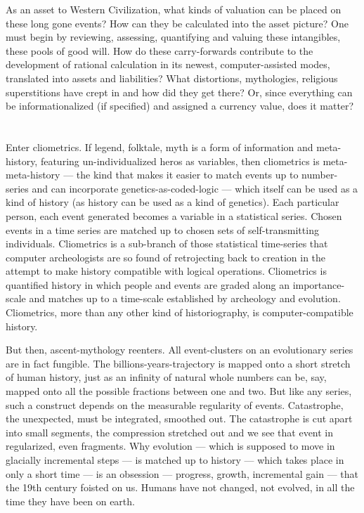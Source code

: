 \documentclass[11pt,twoside,draft]{memoir}
\begin{document}
As an asset to Western Civilization, what
kinds of valuation can be placed on these
long gone events? How can they be calculated into the asset picture? One must begin
by reviewing, assessing, quantifying and
valuing these intangibles, these pools of
good will. How do these carry-forwards contribute to the development of rational calculation in its newest, computer-assisted modes,
translated into assets and liabilities? What
distortions, mythologies, religious superstitions have crept in and how did they get
there? Or, since everything can be informationalized (if specified) and assigned a currency value, does it matter?

\chapter{}

Enter cliometrics. If legend, folktale, myth
is a form of information and meta-history,
featuring un-individualized heros as variables, then cliometrics is meta-meta-history --- 
the kind that makes it easier to match events
up to number-series and can incorporate
genetics-as-coded-logic --- which itself can
be used as a kind of history (as history can be
used as a kind of genetics). Each particular
person, each event generated becomes a variable in a statistical series. Chosen events in
a time series are matched up to chosen sets of
self-transmitting individuals. Cliometrics is
a sub-branch of those statistical time-series
that computer archeologists are so found of
retrojecting back to creation in the attempt to
make history compatible with logical operations. Cliometrics is quantified history in
which people and events are graded along
an importance-scale and matches up to a
time-scale established by archeology and
evolution. Cliometrics, more than any other
kind of historiography, is computer-compatible history.

But then, ascent-mythology reenters. All
event-clusters on an evolutionary series are
in fact fungible. The billions-years-trajectory
is mapped onto a short stretch of human
history, just as an infinity of natural whole
numbers can be, say, mapped onto all the
possible fractions between one and two. But
like any series, such a construct depends on
the measurable regularity of events. Catastrophe, the unexpected, must be integrated,
smoothed out. The catastrophe is cut apart into small segments, the compression stretched
out and we see that event in regularized, even
fragments. Why evolution --- which is supposed to move in glacially incremental
steps --- is matched up to history --- which
takes place in only a short time --- is an
obsession --- progress, growth, incremental
gain --- that the 19th century foisted on us.
Humans have not changed, not evolved, in
all the time they have been on earth.
\end{document}
